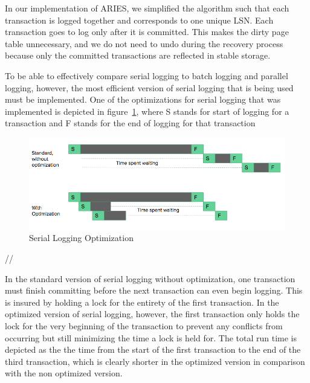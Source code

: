 In our implementation of ARIES, we simplified the algorithm such that each transaction is logged together and corresponds to one unique LSN. Each transaction goes to log only after it is committed. This makes the dirty page table unnecessary, and we do not need to undo during the recovery process because only the committed transactions are reflected in stable storage. \par

To be able to effectively compare serial logging to batch logging and parallel logging, however, the most efficient version of serial logging that is being used must be implemented. One of the optimizations for serial logging that was implemented is depicted in figure~\ref{optimization}, where S stands for start of logging for a transaction and F stands for the end of logging for that transaction\par

\begin{figure}[!h]
  \includegraphics[width=\textwidth]{opt-updated.png}
  \caption{Serial Logging Optimization}
  \label{optimization}
\end{figure}//

In the standard version of serial logging without optimization, one transaction must finish committing before the next transaction can even begin logging. This is insured by holding a lock for the entirety of the first transaction. In the optimized version of serial logging, however, the first transaction only holds the lock for the very beginning of the transaction to prevent any conflicts from occurring but still minimizing the time a lock is held for. The total run time is depicted as the the time from the start of the first transaction to the end of the third transaction, which is clearly shorter in the optimized version in comparison with the non optimized version. 